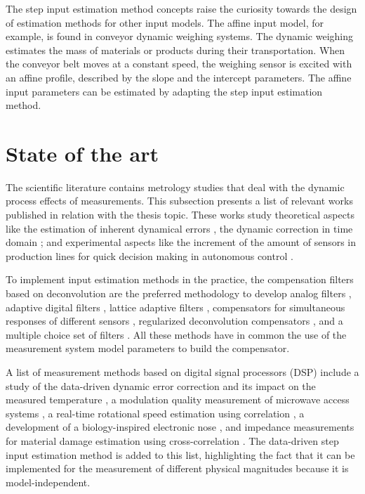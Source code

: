 The step input estimation method concepts raise the curiosity towards the design of estimation methods for other input models.
The affine input model, for example, is found in conveyor dynamic weighing systems.
The dynamic weighing estimates the mass of materials or products during their transportation.
When the conveyor belt moves at a constant speed, the weighing sensor is excited with an affine profile, 
described by the slope and the intercept parameters.
The affine input parameters can be estimated by adapting the step input estimation method.

   
 
\section{State of the art}

The scientific literature contains metrology studies that deal with the dynamic process effects of measurements.
This subsection presents a list of relevant works published in relation with the thesis topic. 
These works study theoretical aspects like the estimation of inherent dynamical errors \citep{Hessling06}, the dynamic correction in time domain \citep{Hessling08a}; and experimental aspects like the increment of the amount of sensors in production lines for quick decision making in autonomous control \citep{Esward09}.  

To implement input estimation methods in the practice, the compensation filters based on deconvolution \citep{Eichstadt10} are the preferred methodology to develop 
analog filters \citep{Jafaripanah05}, 
adaptive digital filters \citep{Shu93}, 
lattice adaptive filters \citep{Hernandez06}, 
compensators for simultaneous responses of different sensors \citep{Boschetti13}, 
regularized deconvolution compensators \citep{Dienstfrey14}, 
and a multiple choice set of filters \citep{Huang16}. 
All these methods have in common the use of the measurement system model parameters to build the compensator.


A list of measurement methods based on digital signal processors (DSP) include 
a study of the data-driven dynamic error correction and its impact on the measured temperature \citep{Saggin01},
a modulation quality measurement of microwave access systems \citep{Angrisani10}, 
a real-time rotational speed estimation using correlation \citep{Wang14},
a development of a biology-inspired electronic nose \citep{Jing16},
and impedance measurements for material damage estimation using cross-correlation \citep{deCastro19}.
The data-driven step input estimation method \citep{Markovsky15cep} is added to this list, highlighting the fact that it can be implemented for the measurement of different physical magnitudes because it is model-independent.


